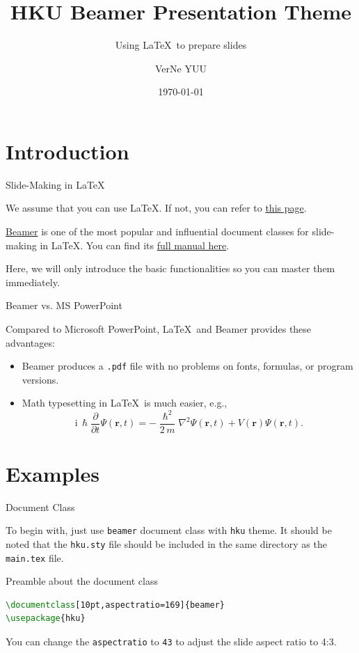\documentclass[10pt,aspectratio=169]{beamer}
\title{HKU Beamer Presentation Theme}
\subtitle{Using \LaTeX\ to prepare slides}
\author{VerNe YUU}
\institute[COMP]{Faculty of Engineering}
\date{\today}
\begin{document}
\maketitle %

\section{Introduction}

\begin{frame}{Slide-Making in \LaTeX}

	We assume that you can use \LaTeX. If not, you can refer to \href{https://www.overleaf.com/learn/latex/Learn_LaTeX_in_30_minutes}{this page}.

	\href{https://www.overleaf.com/learn/latex/Beamer}{Beamer} is one of the most popular and influential document classes for slide-making in \LaTeX. You can find its \href{https://mirror-hk.koddos.net/CTAN/macros/latex/contrib/beamer/doc/beameruserguide.pdf}{full manual here}.

	Here, we will only introduce the basic functionalities so you can master them immediately.
\end{frame}


\begin{frame}{Beamer vs. MS PowerPoint}

	Compared to Microsoft PowerPoint, \LaTeX\ and Beamer provides these advantages:
	
	\begin{itemize}
		\item Beamer produces a \texttt{.pdf} file with no problems on fonts, formulas, or program versions.
		\item Math typesetting in \LaTeX\ is much easier, e.g.,
			\begin{equation*}
				\mathrm{i}\,\hslash\frac{\partial}{\partial t} \Psi(\mathbf{r},t) =
				-\frac{\hslash^2}{2\,m}\nabla^2\Psi(\mathbf{r},t)
				+ V(\mathbf{r})\Psi(\mathbf{r},t).
			\end{equation*}
	\end{itemize}
\end{frame}

\section{Examples}

\begin{frame}[fragile]{Document Class}

	To begin with, just use \texttt{beamer} document class with \texttt{hku} theme. It should be noted that the \texttt{hku.sty} file should be included in the same directory as the \texttt{main.tex} file.
	
\begin{block}{Preamble about the document class}
\begin{lstlisting}[language=TeX]
\documentclass[10pt,aspectratio=169]{beamer}
\usepackage{hku}
\end{lstlisting}
\end{block}
	
	You can change the \texttt{aspectratio} to \texttt{43} to adjust the slide aspect ratio to 4:3.
\end{frame}
\end{document}
